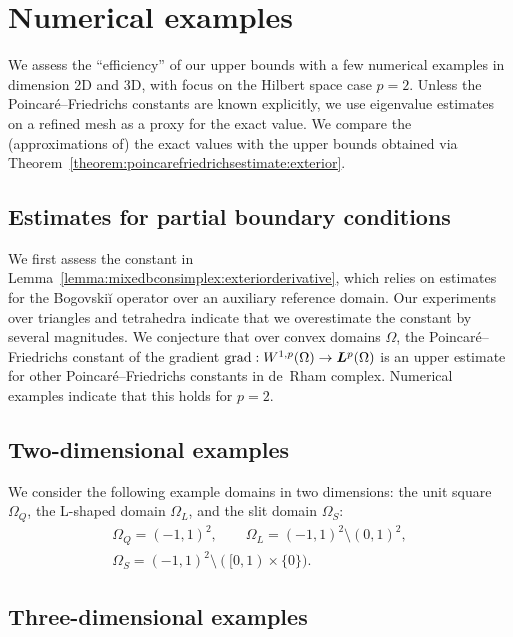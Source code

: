 \documentclass[10pt,a4paper]{article}
\begin{document}
\section{Numerical examples}\label{section:numericalexamples}

We assess the ``efficiency'' of our upper bounds with a few numerical examples in dimension 2D and 3D, with focus on the Hilbert space case $p=2$. 
Unless the Poincar\'e--Friedrichs constants are known explicitly, we use eigenvalue estimates on a refined mesh as a proxy for the exact value. We compare the (approximations of) the exact values with the upper bounds obtained via Theorem~\ref{theorem:poincarefriedrichsestimate:exterior}.

\subsection{Estimates for partial boundary conditions}

We first assess the constant in Lemma~\ref{lemma:mixedbconsimplex:exteriorderivative},
which relies on estimates for the Bogovski\u{i} operator over an auxiliary reference domain.
Our experiments over triangles and tetrahedra indicate that we overestimate the constant by several magnitudes.
%
We conjecture that over convex domains $\Omega$, the Poincar\'e--Friedrichs constant of the gradient $\operatorname{grad} : W^{1,p}(\Omega) \rightarrow \bm{L}^{p}(\Omega)$ is an upper estimate for other Poincar\'e--Friedrichs constants in de~Rham complex. Numerical examples indicate that this holds for $p=2$.




\subsection{Two-dimensional examples}

We consider the following example domains in two dimensions:
the unit square $\Omega_Q$, the L-shaped domain $\Omega_L$, and the slit domain $\Omega_{S}$:
\begin{gather*}
    \Omega_{Q}  = (-1,1)^2,
    \qquad 
    \Omega_{L}  = (-1,1)^2 \setminus (0,1)^2,
    \\
    \Omega_{S} = (-1,1)^2 \setminus ( [0,1) \times \{0\} ).
\end{gather*}

\subsection{Three-dimensional examples}
\end{document}
